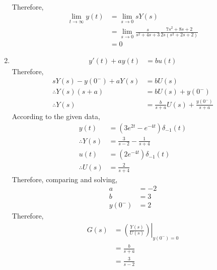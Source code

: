 \documentclass[fleqn, a4paper, 11pt, oneside]{amsart}
\theoremstyle{definition}
\theoremstyle{theorem}
\begin{document}
\begin{solution}
\begin{enumerate}[leftmargin=*]
\begin{align*}
			\end{align*}
			Therefore,
			\begin{align*}
				\lim\limits_{t \to \infty} y(t) & = \lim\limits_{s \to 0} s Y(s)                                                                           \\
                                                & = \lim\limits_{s \to 0} \frac{s}{s^2 + 4 s + 3} \frac{7 s^2 + 8 s + 2}{2 s \left( s^2 + 2 s + 2 \right)} \\
                                                & = 0
			\end{align*}
		\item
			\begin{align*}
				y'(t) + a y(t) & = b u(t)
			\end{align*}
			Therefore,
			\begin{align*}
				s Y(s) - y(0^-) + a Y(s) & = b U(s)          \\
				\therefore Y(s) (s + a)  & = b U(s) + y(0^-) \\
				\therefore Y(s)          & = \frac{b}{s + a} U(s) + \frac{y(0^-)}{s + a}
			\end{align*}
			According to the given data,
			\begin{align*}
				y(t)            & = \left( 3 e^{2 t} - e^{-4 t} \right) \delta_{-1}(t) \\
				\therefore Y(s) & = \frac{3}{s - 2} - \frac{1}{s + 4}                  \\
				u(t)            & = \left( 2 e^{-4 t} \right) \delta_{-1}(t)           \\
				\therefore U(s) & = \frac{2}{s + 4}
			\end{align*}
			Therefore, comparing and solving,
			\begin{align*}
				a      & = -2 \\
				b      & = 3  \\
				y(0^-) & = 2
			\end{align*}
			Therefore,
			\begin{align*}
				G(s) & = \left. \left( \frac{Y(s)}{U(s)} \right) \right|_{y(0^-) = 0} \\
                     & = \frac{b}{s + a}                                              \\
                     & = \frac{3}{s - 2}
			\end{align*}
	\end{enumerate}
\end{solution}
\end{document}
